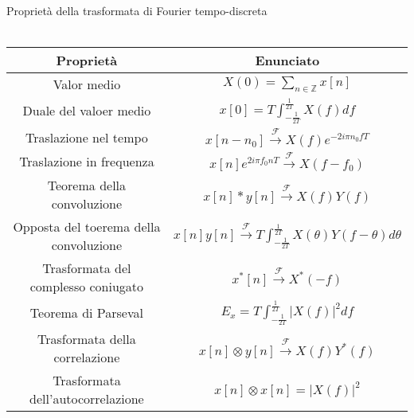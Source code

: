 \documentclass{article}
\newcommand{\trasformata}{\xrightarrow{\mathscr{F}}}
\begin{document}
\newpage\LARGE
\begin{center}
    Proprietà della trasformata di Fourier tempo-discreta\\\scriptsize\hspace*{1cm}\\\Large
    {\renewcommand{\arraystretch}{2}
        \begin{tabular}{|c|c|}
            \hline
            Proprietà&Enunciato\\
            \hline
            Valor medio&\(X(0)=\sum_{n\in\mathbb{Z}}x[n]\)\\
            \hline
            Duale del valoer medio&\(x[0]=T\int_{-\frac{1}{2T}}^{\frac{1}{2T}}X(f)df\)\\
            \hline
            Traslazione nel tempo&\(x[n-n_0]\trasformata X(f)e^{-2i\pi n_0 fT}\)\\
            \hline
            Traslazione in frequenza&\(x[n]e^{2i\pi f_0 nT}\trasformata X(f-f_0)\)\\
            \hline
            Teorema della convoluzione&\(x[n]*y[n]\trasformata X(f)Y(f)\)\\
            \hline
            Opposta del toerema della convoluzione&\(x[n]y[n]\trasformata T\int_{-\frac{1}{2T}}^\frac{1}{2T}X(\theta)Y(f-\theta)d\theta\)\\
            \hline
            Trasformata del complesso coniugato&\(x^*[n]\trasformata X^*(-f)\)\\
            \hline
            Teorema di Parseval&\(E_x=T\int_{-\frac{1}{2T}}^\frac{1}{2T}|X(f)|^2df\)\\
            \hline
            Trasformata della correlazione&\(x[n]\otimes y[n]\trasformata X(f)Y^*(f)\)\\
            \hline
            Trasformata dell'autocorrelazione&\(x[n]\otimes x[n]=|X(f)|^2\)\\
            \hline
        \end{tabular}
    }
\end{center}
\end{document}
